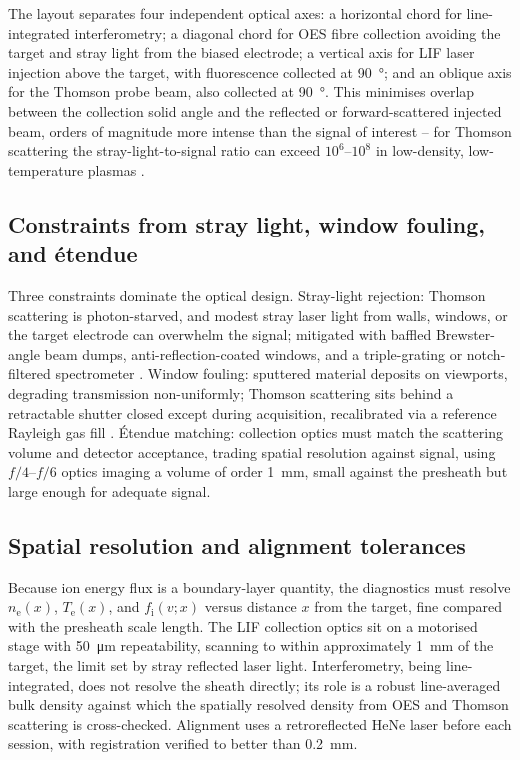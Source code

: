 The layout separates four independent optical axes: a horizontal chord for line-integrated interferometry; a diagonal chord for OES fibre collection avoiding the target and stray light from the biased electrode; a vertical axis for LIF laser injection above the target, with fluorescence collected at \SI{90}{\degree}; and an oblique axis for the Thomson probe beam, also collected at \SI{90}{\degree}. This minimises overlap between the collection solid angle and the reflected or forward-scattered injected beam, orders of magnitude more intense than the signal of interest -- for Thomson scattering the stray-light-to-signal ratio can exceed $10^{6}$--$10^{8}$ in low-density, low-temperature plasmas \cite{ref0357,ref0360}.

\subsection{Constraints from stray light, window fouling, and \'etendue}

Three constraints dominate the optical design. Stray-light rejection: Thomson scattering is photon-starved, and modest stray laser light from walls, windows, or the target electrode can overwhelm the signal; mitigated with baffled Brewster-angle beam dumps, anti-reflection-coated windows, and a triple-grating or notch-filtered spectrometer \cite{ref0355,ref0362}. Window fouling: sputtered material deposits on viewports, degrading transmission non-uniformly; Thomson scattering sits behind a retractable shutter closed except during acquisition, recalibrated via a reference Rayleigh gas fill \cite{ref0355,ref0384}. \'Etendue matching: collection optics must match the scattering volume and detector acceptance, trading spatial resolution against signal, using $f/4$--$f/6$ optics imaging a volume of order \SI{1}{\milli\meter}, small against the presheath but large enough for adequate signal.

\subsection{Spatial resolution and alignment tolerances}

Because ion energy flux is a boundary-layer quantity, the diagnostics must resolve $n_{\mathrm{e}}(x)$, $T_{\mathrm{e}}(x)$, and $f_{\mathrm{i}}(v;x)$ versus distance $x$ from the target, fine compared with the presheath scale length. The LIF collection optics sit on a motorised stage with \SI{50}{\micro\meter} repeatability, scanning to within approximately \SI{1}{\milli\meter} of the target, the limit set by stray reflected laser light. Interferometry, being line-integrated, does not resolve the sheath directly; its role is a robust line-averaged bulk density against which the spatially resolved density from OES and Thomson scattering is cross-checked. Alignment uses a retroreflected HeNe laser before each session, with registration verified to better than \SI{0.2}{\milli\meter}.

